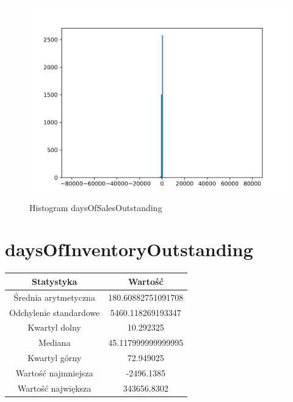 \documentclass{article}
\begin{document}
\begin{figure}[h!]
    \includegraphics[width=\linewidth]{variables/daysOfSalesOutstanding.png}
    \caption{Histogram daysOfSalesOutstanding }
\end{figure}\section{ daysOfInventoryOutstanding }

\begin{center}
    \begin{tabular}{|c | c|} 
    \hline
    Statystyka & Wartość \\
    \hline\hline
    Średnia arytmetyczna & 180.60882751091708 \\ 
    \hline
    Odchylenie standardowe & 5460.118269193347 \\
    \hline
    Kwartyl dolny & 10.292325 \\
    \hline
    Mediana & 45.117999999999995 \\
    \hline
    Kwartyl górny & 72.949025 \\
    \hline
    Wartość najmniejsza & -2496.1385 \\
    \hline
    Wartość największa & 343656.8302 \\
    \hline
   \end{tabular}
\end{center}
\end{document}
